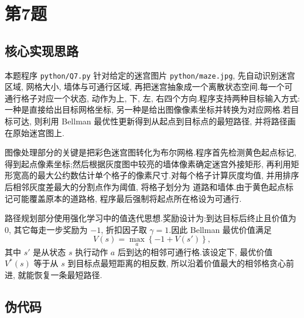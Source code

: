 ﻿\documentclass[UTF8,  zihao=-4]{ctexart}
\begin{document}
\section{第7题}

\subsection{核心实现思路}

本题程序 \texttt{python/Q7.py} 针对给定的迷宫图片 \texttt{python/maze.jpg},  先自动识别迷宫区域,  网格大小,  墙体与可通行区域,  
再把迷宫抽象成一个离散状态空间.每一个可通行格子对应一个状态,  动作为上,  下,  左,  右四个方向.程序支持两种目标输入方式:
一种是直接给出目标网格坐标,  另一种是给出图像像素坐标并转换为对应网格.若目标可达,  则利用 Bellman 最优性更新得到从起点到目标点的最短路径,  
并将路径画在原始迷宫图上.

图像处理部分的关键是把彩色迷宫图转化为布尔网格.程序首先检测黄色起点标记,  得到起点像素坐标;然后根据灰度图中较亮的墙体像素确定迷宫外接矩形,  
再利用矩形宽高的最大公约数估计单个格子的像素尺寸.对每个格子计算灰度均值,  并用排序后相邻灰度差最大的分割点作为阈值,  将格子划分为
道路和墙体.由于黄色起点标记可能覆盖原本的道路格,  程序最后强制将起点所在格设为可通行.

路径规划部分使用强化学习中的值迭代思想.奖励设计为:到达目标后终止且价值为 \(0\),  其它每走一步奖励为 \(-1\),  折扣因子取
\(\gamma=1\).因此 Bellman 最优价值满足
\[
    V(s)=
    \max_{a}
    \left\{
        -1+V(s')
    \right\},  
\]
其中 \(s'\) 是从状态 \(s\) 执行动作 \(a\) 后到达的相邻可通行格.该设定下,  最优价值 \(V^*(s)\) 等于从 \(s\) 到目标点最短距离的相反数,  
所以沿着价值最大的相邻格贪心前进,  就能恢复一条最短路径.

\subsection{伪代码}
\end{document}
